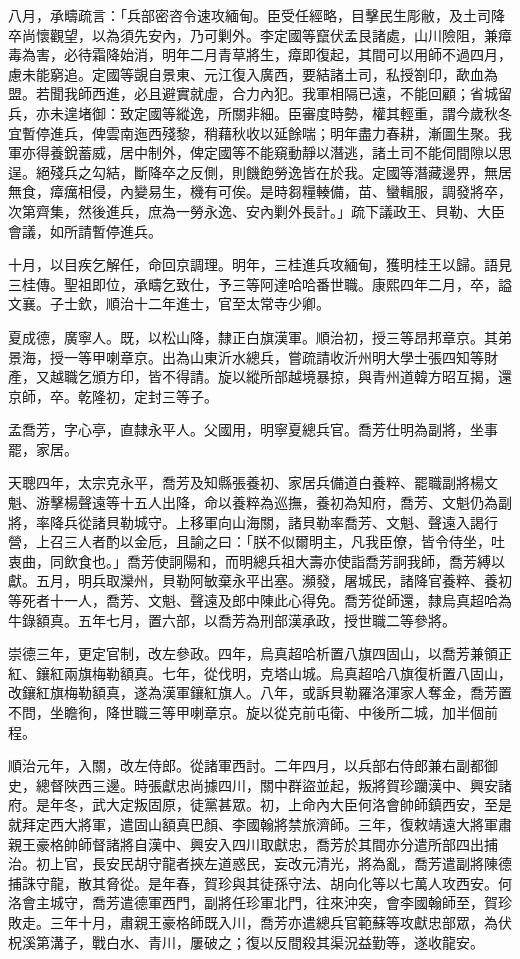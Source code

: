 \begin{pinyinscope}
八月，承疇疏言：「兵部密咨令速攻緬甸。臣受任經略，目擊民生彫敝，及土司降卒尚懷觀望，以為須先安內，乃可剿外。李定國等竄伏孟艮諸處，山川險阻，兼瘴毒為害，必待霜降始消，明年二月青草將生，瘴即復起，其間可以用師不過四月，慮未能窮追。定國等覬自景東、元江復入廣西，要結諸土司，私授劄印，歃血為盟。若聞我師西進，必且避實就虛，合力內犯。我軍相隔已遠，不能回顧；省城留兵，亦未遑堵御：致定國等縱逸，所關非細。臣審度時勢，權其輕重，謂今歲秋冬宜暫停進兵，俾雲南迤西殘黎，稍藉秋收以延餘喘；明年盡力春耕，漸圖生聚。我軍亦得養銳蓄威，居中制外，俾定國等不能窺動靜以潛逃，諸土司不能伺間隙以思逞。絕殘兵之勾結，斷降卒之反側，則饑飽勞逸皆在於我。定國等潛藏邊界，無居無食，瘴癘相侵，內變易生，機有可俟。是時芻糧輳備，苗、蠻輯服，調發將卒，次第齊集，然後進兵，庶為一勞永逸、安內剿外長計。」疏下議政王、貝勒、大臣會議，如所請暫停進兵。

十月，以目疾乞解任，命回京調理。明年，三桂進兵攻緬甸，獲明桂王以歸。語見三桂傳。聖祖即位，承疇乞致仕，予三等阿達哈哈番世職。康熙四年二月，卒，謚文襄。子士欽，順治十二年進士，官至太常寺少卿。

夏成德，廣寧人。既，以松山降，隸正白旗漢軍。順治初，授三等昂邦章京。其弟景海，授一等甲喇章京。出為山東沂水總兵，嘗疏請收沂州明大學士張四知等財產，又越職乞頒方印，皆不得請。旋以縱所部越境暴掠，與青州道韓方昭互揭，還京師，卒。乾隆初，定封三等子。

孟喬芳，字心亭，直隸永平人。父國用，明寧夏總兵官。喬芳仕明為副將，坐事罷，家居。

天聰四年，太宗克永平，喬芳及知縣張養初、家居兵備道白養粹、罷職副將楊文魁、游擊楊聲遠等十五人出降，命以養粹為巡撫，養初為知府，喬芳、文魁仍為副將，率降兵從諸貝勒城守。上移軍向山海關，諸貝勒率喬芳、文魁、聲遠入謁行營，上召三人者酌以金卮，且諭之曰：「朕不似爾明主，凡我臣僚，皆令侍坐，吐衷曲，同飲食也。」喬芳使詗陽和，而明總兵祖大壽亦使詣喬芳詗我師，喬芳縛以獻。五月，明兵取灤州，貝勒阿敏棄永平出塞。瀕發，屠城民，諸降官養粹、養初等死者十一人，喬芳、文魁、聲遠及郎中陳此心得免。喬芳從師還，隸烏真超哈為牛錄額真。五年七月，置六部，以喬芳為刑部漢承政，授世職二等參將。

崇德三年，更定官制，改左參政。四年，烏真超哈析置八旗四固山，以喬芳兼領正紅、鑲紅兩旗梅勒額真。七年，從伐明，克塔山城。烏真超哈八旗復析置八固山，改鑲紅旗梅勒額真，遂為漢軍鑲紅旗人。八年，或訴貝勒羅洛渾家人奪金，喬芳置不問，坐瞻徇，降世職三等甲喇章京。旋以從克前屯衛、中後所二城，加半個前程。

順治元年，入關，改左侍郎。從諸軍西討。二年四月，以兵部右侍郎兼右副都御史，總督陜西三邊。時張獻忠尚據四川，關中群盜並起，叛將賀珍躪漢中、興安諸府。是年冬，武大定叛固原，徒黨甚眾。初，上命內大臣何洛會帥師鎮西安，至是就拜定西大將軍，遣固山額真巴顏、李國翰將禁旅濟師。三年，復敕靖遠大將軍肅親王豪格帥師督諸將自漢中、興安入四川取獻忠，喬芳於其間亦分遣所部四出捕治。初上官，長安民胡守龍者挾左道惑民，妄改元清光，將為亂，喬芳遣副將陳德捕誅守龍，散其脅從。是年春，賀珍與其徒孫守法、胡向化等以七萬人攻西安。何洛會主城守，喬芳遣德軍西門，副將任珍軍北門，往來沖突，會李國翰師至，賀珍敗走。三年十月，肅親王豪格師既入川，喬芳亦遣總兵官範蘇等攻獻忠部眾，為伏柷溪第溝子，戰白水、青川，屢破之；復以反間殺其渠況益勤等，遂收龍安。


\end{pinyinscope}
